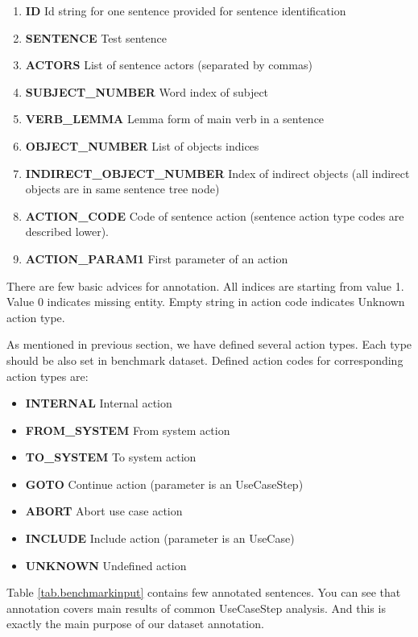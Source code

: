 \begin{enumerate}
\item {\bf ID } Id string for one sentence provided for sentence identification
\item {\bf SENTENCE } Test sentence
\item {\bf ACTORS } List of sentence actors (separated by commas)
\item {\bf SUBJECT\_NUMBER } Word index of subject
\item {\bf VERB\_LEMMA } Lemma form of main verb in a sentence
\item {\bf OBJECT\_NUMBER} List of objects indices
\item {\bf INDIRECT\_OBJECT\_NUMBER} Index of indirect objects (all indirect objects are in same sentence tree node)
\item {\bf ACTION\_CODE} Code of sentence action (sentence action type codes are described lower). 
\item {\bf ACTION\_PARAM1} First parameter of an action
\end{enumerate}   
   
There are few basic advices for annotation. All indices are starting from value 1. Value 0 indicates missing entity. Empty string in action code indicates Unknown action type. 

As mentioned in previous section, we have defined several action types. Each type should be also set in benchmark dataset. Defined action codes for corresponding action types are:      
     
\begin{itemize}
\item {\bf INTERNAL} Internal action
\item {\bf FROM\_SYSTEM} From system action
\item {\bf TO\_SYSTEM} To system action
\item {\bf GOTO} Continue action (parameter is an UseCaseStep)
\item {\bf ABORT} Abort use case action
\item {\bf INCLUDE} Include action (parameter is an UseCase)
\item {\bf UNKNOWN} Undefined action
\end{itemize}     

Table \ref{tab.benchmarkinput} contains few annotated sentences. You can see that annotation covers main results of common UseCaseStep analysis. And this is exactly the main purpose of our dataset annotation.
      
